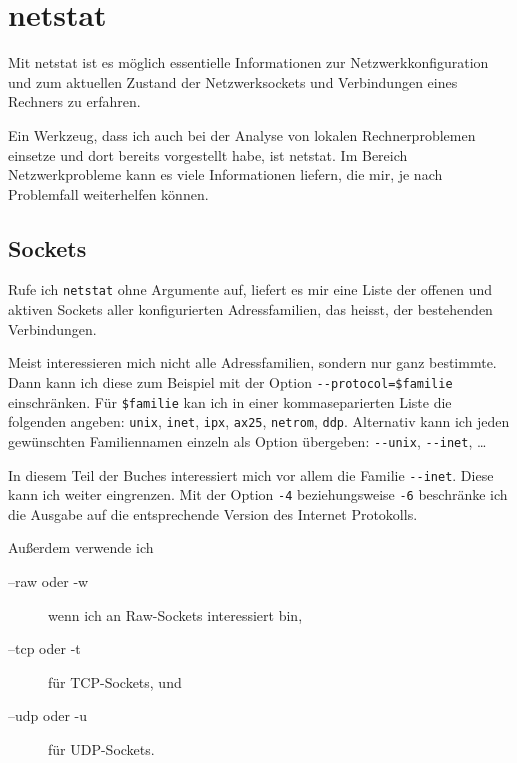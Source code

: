 \section{netstat}
\label{sec:netz-werkzeuge-netstat}
\begin{abstractsec}
  Mit netstat ist es möglich essentielle Informationen zur
  Netzwerkkonfiguration und zum aktuellen Zustand der Netzwerksockets und
  Verbindungen eines Rechners zu erfahren.
\end{abstractsec}
\begin{normaltext}
  Ein Werkzeug, dass ich auch bei der Analyse von lokalen Rechnerproblemen
  einsetze und dort bereits vorgestellt habe, ist netstat. Im Bereich
  Netzwerkprobleme kann es viele Informationen liefern, die mir, je nach
  Problemfall weiterhelfen können.

  \subsection*{Sockets}
  \label{sec:netz-werkzeuge-netstat-sockets}

  Rufe ich \verb?netstat? ohne Argumente auf, liefert es mir eine Liste der
  offenen und aktiven Sockets aller konfigurierten Adressfamilien, das
  heisst, der bestehenden Verbindungen.

  Meist interessieren mich nicht alle Adressfamilien, sondern nur ganz
  bestimmte. Dann kann ich diese zum Beispiel mit der Option
  \verb?--protocol=$familie? einschränken. Für \verb?$familie? kan ich in
  einer kommaseparierten Liste die folgenden angeben: \verb?unix?,
  \verb?inet?, \verb?ipx?, \verb?ax25?, \verb?netrom?, \verb?ddp?. Alternativ
  kann ich jeden gewünschten Familiennamen einzeln als Option übergeben:
  \verb?--unix?, \verb?--inet?, \ldots

  In diesem Teil der Buches interessiert mich vor allem die Familie
  \verb?--inet?. Diese kann ich weiter eingrenzen. Mit der Option \verb?-4?
  beziehungsweise \verb?-6? beschränke ich die Ausgabe auf die entsprechende
  Version des Internet Protokolls.

  Außerdem verwende ich
  \begin{description}
    \item[--raw oder -w] wenn ich an Raw-Sockets interessiert bin,
    \item[--tcp oder -t] für TCP-Sockets, und
    \item[--udp oder -u] für UDP-Sockets.
  \end{description}


\end{normaltext}

